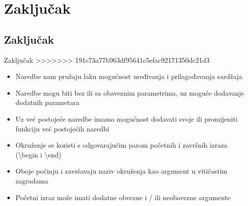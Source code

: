 \documentclass{beamer}
\begin{document}
\section{Zaključak}


\subsection{Zaključak}
\begin{frame}{Zaključak}
>>>>>>> 191e73a77b963df95641c5efac92171350dc21d3
\begin{itemize}
	\item Naredbe nam pružaju laku mogućnost uređivanja i prilagođavanja sardžaja
	\item Naredbe mogu biti bez ili sa obaveznim parametrima, uz moguće dodavanje dodatnih parametara
	\item Uz već postojeće naredbe imamo mogućnost dodavati svoje ili promijeniti funkciju već postojećih naredbi
	\item Okruženje se koristi s odgovarajućim parom početnih i završnih izraza (\textbackslash begin i \textbackslash end)
	\item Oboje počinju i završavaju naziv okruženja kao argument u vitičastim zagradama
	\item Početni izraz može imati dodatne obvezne i / ili neobavezne argumente

\end{itemize}
\end{frame}




\end{document}
